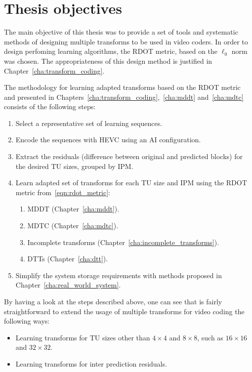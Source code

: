 \documentclass[11pt,a4paper,openright,twoside]{book}
\numberwithin{equation}{section} %
\numberwithin{figure}{section} %
\numberwithin{table}{section} %
\begin{document}
\section*{Thesis objectives}
\label{sec:thesis_objectives}

The main objective of this thesis was to provide a set of tools and systematic
methods of designing multiple transforms to be used in video coders.
In order to design perfoming learning algorithms, the \ac{RDOT} metric, based
on the $\ell_0$ norm was chosen.
The appropriateness of this design method is justified in
Chapter~\ref{cha:transform_coding}.

The methodology for learning adapted transforms based on the \ac{RDOT} metric
and presented in Chapters~\ref{cha:transform_coding},~\ref{cha:mddt}
and~\ref{cha:mdtc} consists of the following steps:
\begin{enumerate}
	\item Select a representative set of learning sequences.
	\item Encode the sequences with \ac{HEVC} using an \ac{AI} configuration.
	\item Extract the residuals (difference between original and predicted
		blocks) for the desired \ac{TU} sizes, grouped by \ac{IPM}.
	\item Learn adapted set of transforms for each \ac{TU} size and \ac{IPM}
		using the \acs{RDOT} metric from~\eqref{eqn:rdot_metric}:
		\begin{enumerate}
			\item \acs{MDDT} (Chapter~\ref{cha:mddt}).
			\item \acs{MDTC} (Chapter~\ref{cha:mdtc}).
			\item Incomplete transforms
				(Chapter~\ref{cha:incomplete_transforms}).
			\item \acp{DTT} (Chapter~\ref{cha:dtt}).
		\end{enumerate}
	\item Simplify the system storage requirements with methods proposed in
		Chapter~\ref{cha:real_world_system}.
\end{enumerate}

By having a look at the steps described above, one can see that is fairly
straightforward to extend the usage of multiple transforms for video coding
the following ways:
\begin{itemize}
	\item Learning transforms for \ac{TU} sizes other than $4\times4$ and
		$8\times8$, such as $16\times16$ and $32\times32$.
	\item Learning transforms for inter prediction residuals.
\end{itemize}
\end{document}
